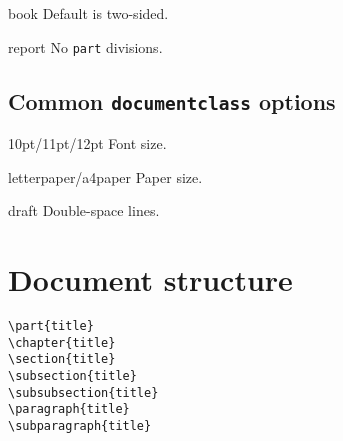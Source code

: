 \begin{ttdesc}[labelwidth=\widthof{\texttt{report}}]
\item[book] Default is two-sided.
\item[report] No \texttt{part} divisions.
\end{ttdesc}

\subsection{Common \texttt{documentclass} options}

\begin{ttdesc}[labelwidth=\widthof{\ttfamily{letterpaper/a4paper}}]
\item[10pt/11pt/12pt] Font size.
\item[letterpaper/a4paper] Paper size.
\item[draft] Double-space lines.
\end{ttdesc}

\section{Document structure}

\vspace{-\baselineskip}

\begin{multicols*}{2}
\lstinline|\part{title}| \\
\lstinline|\chapter{title}| \\
\lstinline|\section{title}| \\
\lstinline|\subsection{title}| \\
\lstinline|\subsubsection{title}| \\
\lstinline|\paragraph{title}| \\
\lstinline|\subparagraph{title}|
\end{multicols*}

